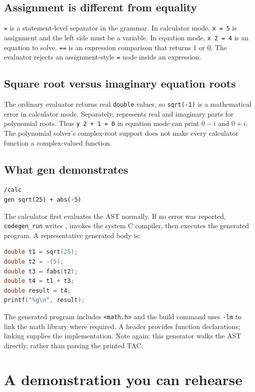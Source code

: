 \documentclass[11pt,a4paper]{report}
\newcommand{\file}[1]{\texttt{\detokenize{#1}}}
\begin{document}
\section{Assignment is different from equality}
\texttt{=} is a statement-level separator in the grammar. In calculator
mode, \texttt{x = 5} is assignment and the left side must be a variable.
In equation mode, \texttt{x 2 = 4} is an equation to solve.
\texttt{==} is an expression comparison that returns $1$ or $0$.
The evaluator rejects an assignment-style \texttt{=} node inside an expression.

\section{Square root versus imaginary equation roots}
The ordinary evaluator returns real \texttt{double} values, so
\texttt{sqrt(-1)} is a mathematical error in calculator mode. Separately,
\file{src/poly.c} represents real and imaginary parts for polynomial roots.
Thus \texttt{y 2 + 1 = 0} in equation mode can print $0-i$ and $0+i$.
The polynomial solver's complex-root support does not make every calculator
function a complex-valued function.

\section{What gen demonstrates}
\begin{lstlisting}
/calc
gen sqrt(25) + abs(-5)
\end{lstlisting}
The calculator first evaluates the AST normally. If no error was reported,
\texttt{codegen\_run} writes \file{output/generated.c}, invokes the system C
compiler, then executes the generated program. A representative generated
body is:
\begin{lstlisting}[language=C]
double t1 = sqrt(25);
double t2 = -(5);
double t3 = fabs(t2);
double t4 = t1 + t3;
double result = t4;
printf("%g\n", result);
\end{lstlisting}
The generated program includes \texttt{<math.h>} and the build command uses
\texttt{-lm} to link the math library where required. A header provides
function declarations; linking supplies the implementation. Note again:
this generator walks the AST directly, rather than parsing the printed TAC.

\chapter{A demonstration you can rehearse}
\end{document}
